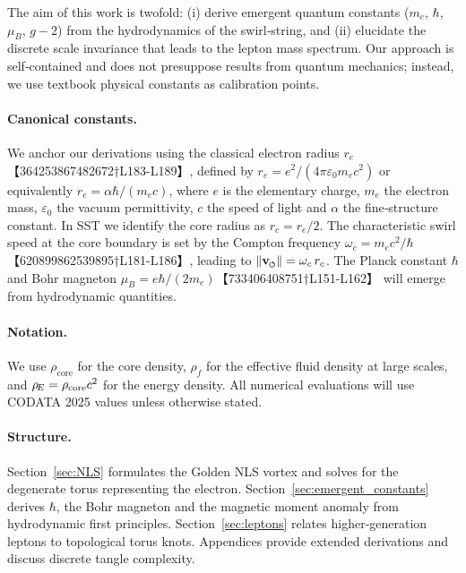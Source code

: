 \documentclass[11pt]{article}
\newcommand{\vnorm}{\lVert \mathbf{v}_{\mkern-2mu\scriptscriptstyle\boldsymbol{\circlearrowleft}} \rVert}  %
\newcommand{\rhoF}{\rho_{\!f}}\newcommand{\rhof}{\rho_{\!f}}     %
\newcommand{\rc}{r_c}                                    %
\newcommand{\rhocore}{\rho_{\text{core}}}
\begin{document}
The aim of this work is twofold: (i) derive emergent quantum constants ($m_e$, $\hbar$, $\mu_B$, $g-2$) from the hydrodynamics of the swirl‑string, and (ii) elucidate the discrete scale invariance that leads to the lepton mass spectrum.  Our approach is self‑contained and does not presuppose results from quantum mechanics; instead, we use textbook physical constants as calibration points.






\paragraph{Canonical constants.}  We anchor our derivations using the classical electron radius $r_e$【364253867482672†L183-L189】, defined by $r_e = e^2/(4\pi\varepsilon_0 m_e c^2)$ or equivalently $r_e = \alpha\hbar/(m_e c)$, where $e$ is the elementary charge, $m_e$ the electron mass, $\varepsilon_0$ the vacuum permittivity, $c$ the speed of light and $\alpha$ the fine‑structure constant.  In SST we identify the core radius as $\rc = r_e/2$.  The characteristic swirl speed at the core boundary is set by the Compton frequency $\omega_c = m_e c^2/\hbar$【620899862539895†L181-L186】, leading to $\vnorm = \omega_c\,\rc$.  The Planck constant $\hbar$ and Bohr magneton $\mu_B = e\hbar/(2 m_e)$【733406408751†L151-L162】 will emerge from hydrodynamic quantities.






\paragraph{Notation.}  We use $\rhocore$ for the core density, $\rhoF$ for the effective fluid density at large scales, and $\rhoe = \rhocore c^2$ for the energy density.  All numerical evaluations will use CODATA 2025 values unless otherwise stated.






\paragraph{Structure.}  Section~\ref{sec:NLS} formulates the Golden NLS vortex and solves for the degenerate torus representing the electron.  Section~\ref{sec:emergent_constants} derives $\hbar$, the Bohr magneton and the magnetic moment anomaly from hydrodynamic first principles.  Section~\ref{sec:leptons} relates higher‑generation leptons to topological torus knots.  Appendices provide extended derivations and discuss discrete tangle complexity.
\end{document}
